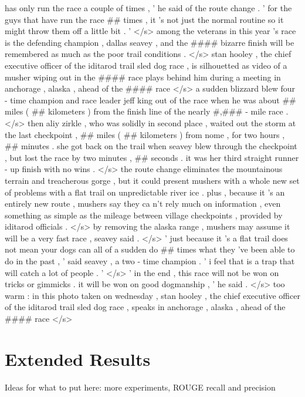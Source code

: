 \documentclass[12pt]{report}
\begin{document}
\begin{appendices}
has only run the race a couple of times , ' he said of the route change . ' for the guys that have run the race ## times , it 's not just the normal routine so it might throw them off a little bit . ' </s> among the veterans in this year 's race is the defending champion , dallas seavey , and the #### bizarre finish will be remembered as much as the poor trail conditions . </s> stan hooley , the chief executive officer of the iditarod trail sled dog race , is silhouetted as video of a musher wiping out in the #### race plays behind him during a meeting in anchorage , alaska , ahead of the #### race </s> a sudden blizzard blew four - time champion and race leader jeff king out of the race when he was about ## miles ( ## kilometers ) from the finish line of the nearly #,### - mile race . </s> then aliy zirkle , who was solidly in second place , waited out the storm at the last checkpoint , ## miles ( ## kilometers ) from nome , for two hours , ## minutes . she got back on the trail when seavey blew through the checkpoint , but lost the race by two minutes , ## seconds . it was her third straight runner - up finish with no wins . </s> the route change eliminates the mountainous terrain and treacherous gorge , but it could present mushers with a whole new set of problems with a flat trail on unpredictable river ice . plus , because it 's an entirely new route , mushers say they ca n't rely much on information , even something as simple as the mileage between village checkpoints , provided by iditarod officials . </s> by removing the alaska range , mushers may assume it will be a very fast race , seavey said . </s> ' just because it 's a flat trail does not mean your dogs can all of a sudden do ## times what they 've been able to do in the past , ' said seavey , a two - time champion . ' i feel that is a trap that will catch a lot of people . ' </s> ' in the end , this race will not be won on tricks or gimmicks . it will be won on good dogmanship , ' he said . </s> too warm : in this photo taken on wednesday , stan hooley , the chief executive officer of the iditarod trail sled dog race , speaks in anchorage , alaska , ahead of the #### race </s>

\chapter{Extended Results}
\label{appendix:more_results}
Ideas for what to put here: more experiments, ROUGE recall and precision
\end{appendices}
\end{document}
